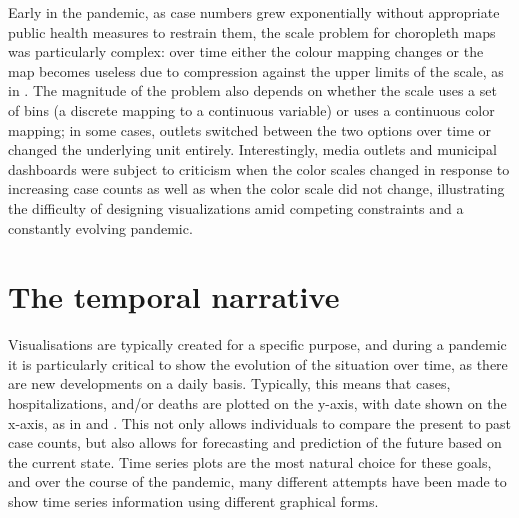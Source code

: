 \documentclass[article]{jdssv}\usepackage[]{graphicx}\usepackage[]{xcolor}
\begin{document}
Early in the pandemic, as case numbers grew exponentially without appropriate public health measures to restrain them, the scale problem for choropleth maps was particularly complex: over time either the colour mapping changes or the map becomes useless due to compression against the upper limits of the scale, as in \citet{panchadsaramIfWeAre2020}. 
The magnitude of the problem also depends on whether the scale uses a set of bins (a discrete mapping to a continuous variable) or uses a continuous color mapping; in some cases, outlets switched between the two options over time or changed the underlying unit entirely. 
Interestingly, media outlets and municipal dashboards were subject to criticism when the color scales changed in response to increasing case counts\citep{boeckDataVizDecisionmakingAction2020} as well as when the color scale did not change\citep{sandalowChiTribGraphicsPleaseUpdate2020}, illustrating the difficulty of designing visualizations amid competing constraints and a constantly evolving pandemic.






\section{The temporal narrative}

Visualisations are typically created for a specific purpose, and during a pandemic it is particularly critical to show the evolution of the situation over time, as there are new developments on a daily basis. 
Typically, this means that cases, hospitalizations, and/or deaths are plotted on the y-axis, with date shown on the x-axis, as in  and . 
This not only allows individuals to compare the present to past case counts, but also allows for forecasting and prediction of the future based on the current state. 
Time series plots are the most natural choice for these goals, and over the course of the pandemic, many different attempts have been made to show time series information using different graphical forms. 
\end{document}
